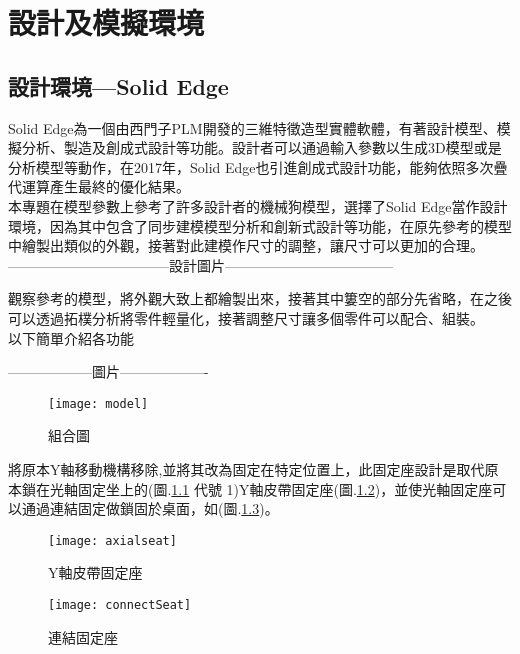 \chapter{設計及模擬環境}
\section{設計環境---Solid Edge}

Solid Edge為一個由西門子PLM開發的三維特徵造型實體軟體，有著設計模型、模擬分析、製造及創成式設計等功能。設計者可以通過輸入參數以生成3D模型或是分析模型等動作，在2017年，Solid Edge也引進創成式設計功能，能夠依照多次疊代運算產生最終的優化結果。\\

本專題在模型參數上參考了許多設計者的機械狗模型，選擇了Solid Edge當作設計環境，因為其中包含了同步建模模型分析和創新式設計等功能，在原先參考的模型中繪製出類似的外觀，接著對此建模作尺寸的調整，讓尺寸可以更加的合理。\\

-----------------------------------設計圖片------------------------------------

觀察參考的模型，將外觀大致上都繪製出來，接著其中簍空的部分先省略，在之後可以透過拓樸分析將零件輕量化，接著調整尺寸讓多個零件可以配合、組裝。\\

以下簡單介紹各功能\

------------------圖片-------------------

\begin{figure}[hbt!]
\center
\texttt{[image: model]}
\caption{\Large 組合圖}
\label{model}
\end{figure}

\qquad 將原本Y軸移動機構移除,並將其改為固定在特定位置上，此固定座設計是取代原本鎖在光軸固定坐上的(圖.\ref{model} 代號 1)Y軸皮帶固定座(圖.\ref{axialseat})，並使光軸固定座可以通過連結固定做鎖固於桌面，如(圖.\ref{connectSeat})。\\

\begin{figure}[hbt!]
\center
\texttt{[image: axialseat]}
\caption{\Large Y軸皮帶固定座}
\label{axialseat}
\end{figure}

\begin{figure}[hbt!]
\center
\texttt{[image: connectSeat]}
\caption{\Large 連結固定座}
\label{connectSeat}
\end{figure}


